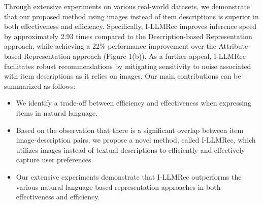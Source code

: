 \documentclass[sigconf]{acmart}
\newcommand{\proposed}{\textsf{I-LLMRec}}
\begin{document}




Through extensive experiments on various real-world datasets, we demonstrate that our proposed method using images instead of item descriptions is superior in both effectiveness and efficiency. Specifically, \proposed{} improves inference speed by approximately 2.93 times compared to the Description-based Representation approach, while achieving a 22\% performance improvement over the Attribute-based Representation approach (Figure 1(b)). As a further appeal, \proposed{} facilitates robust recommendations by mitigating sensitivity to noise associated with item descriptions as it relies on images. Our main contributions can be summarized as follows:


\begin{itemize}[leftmargin=5mm]
    \item {We identify a trade-off between efficiency and effectiveness when expressing items in natural language.}
    \item  {Based on the observation that there is a significant overlap between item image-description pairs, we propose a novel method, called \proposed{}, which utilizes images instead of textual descriptions to efficiently and effectively capture user preferences.}
    \item {Our extensive experiments demonstrate that \proposed{} outperforms the various natural language-based representation approaches in both effectiveness and efficiency.}
\end{itemize}
\end{document}
